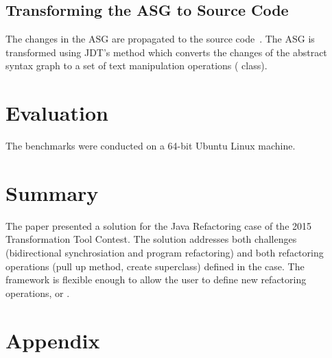 \documentclass[submission,copyright,creativecommons]{eptcs}
\begin{document}
\subsection{Transforming the ASG to Source Code}

The changes in the ASG are propagated to the source code~. The ASG is transformed using JDT's  method which converts the changes of the abstract syntax graph to a set of text manipulation operations ( class).

\section{Evaluation}

The benchmarks were conducted on a 64-bit Ubuntu Linux machine.


\section{Summary}

The paper presented a solution for the Java Refactoring case of the 2015 Transformation Tool Contest. The solution addresses both challenges (bidirectional synchrosiation and program refactoring) and both refactoring operations (pull up method, create superclass) defined in the case. The framework is flexible enough to allow the user to define new refactoring operations, \eg {} or .




\clearpage

\appendix
\section{Appendix}


\end{document}
